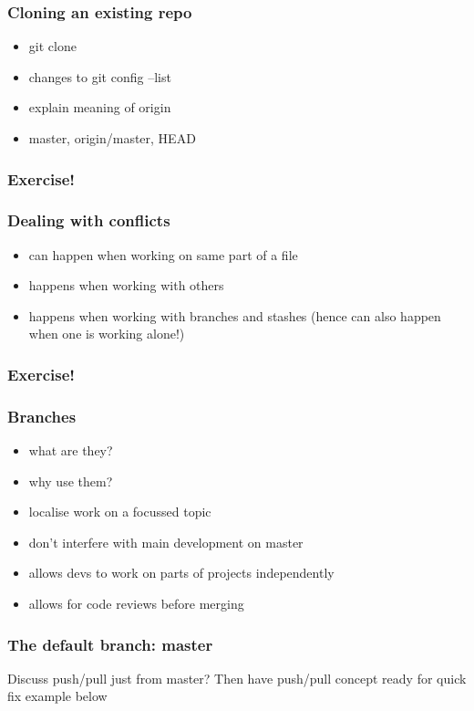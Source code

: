 \documentclass{git_course}
\begin{document}
\begin{frame}
\frametitle{Cloning an existing repo}
\begin{itemize}
    \item git clone
    \item changes to git config --list
    \item explain meaning of origin
    \item master, origin/master, HEAD
\end{itemize}
\end{frame}

\begin{frame}
\frametitle{Exercise!}
\end{frame}

\begin{frame}
\frametitle{Dealing with conflicts}
\begin{itemize}
    \item can happen when working on same part of a file
    \item happens when working with others
    \item happens when working with branches and stashes (hence can also
        happen when one is working alone!)
\end{itemize}
\end{frame}

\begin{frame}
\frametitle{Exercise!}
\end{frame}

\begin{frame}
\frametitle{Branches}
\begin{itemize}
    \item what are they?
    \item why use them?
    \item localise work on a focussed topic
    \item don't interfere with main development on master
    \item allows devs to work on parts of projects independently
    \item allows for code reviews before merging
\end{itemize}
\end{frame}

\begin{frame}
\frametitle{The default branch: master}

Discuss push/pull just from master?  Then have push/pull concept ready
for quick fix example below
\end{frame}
\end{document}
